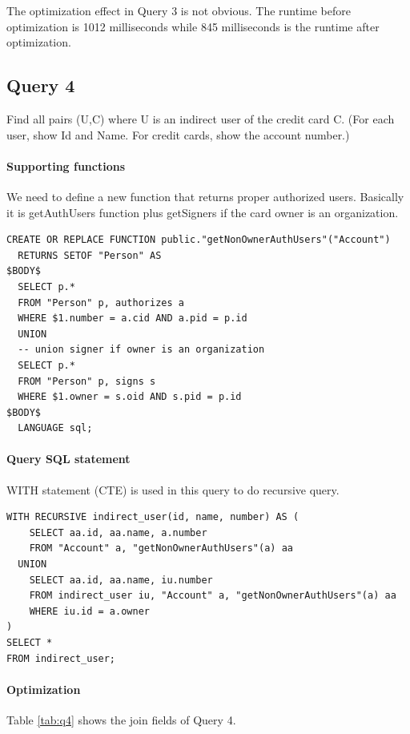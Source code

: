 \documentclass[11pt]{article}
\begin{document}
\par
The optimization effect in Query 3 is not obvious. The runtime before optimization is 1012 milliseconds while 845 milliseconds is the runtime after optimization.

\subsection{Query 4}
Find all pairs (U,C) where U is an indirect user of the credit card C. (For each user, show Id and Name. For credit cards, show the account number.)

\paragraph{Supporting functions} We need to define a new function that returns proper authorized users. Basically it is getAuthUsers function plus getSigners if the card owner is an organization.
\begin{verbatim}
CREATE OR REPLACE FUNCTION public."getNonOwnerAuthUsers"("Account")
  RETURNS SETOF "Person" AS
$BODY$
  SELECT p.*
  FROM "Person" p, authorizes a
  WHERE $1.number = a.cid AND a.pid = p.id
  UNION
  -- union signer if owner is an organization
  SELECT p.*
  FROM "Person" p, signs s
  WHERE $1.owner = s.oid AND s.pid = p.id
$BODY$
  LANGUAGE sql;
\end{verbatim}

\paragraph{Query SQL statement} WITH statement (CTE) is used in this query to do recursive query.
\begin{verbatim}
WITH RECURSIVE indirect_user(id, name, number) AS (
    SELECT aa.id, aa.name, a.number
    FROM "Account" a, "getNonOwnerAuthUsers"(a) aa
  UNION
    SELECT aa.id, aa.name, iu.number
    FROM indirect_user iu, "Account" a, "getNonOwnerAuthUsers"(a) aa
    WHERE iu.id = a.owner
)
SELECT *
FROM indirect_user;
\end{verbatim}

\paragraph{Optimization} Table \ref{tab:q4} shows the join fields of Query 4.
\end{document}
